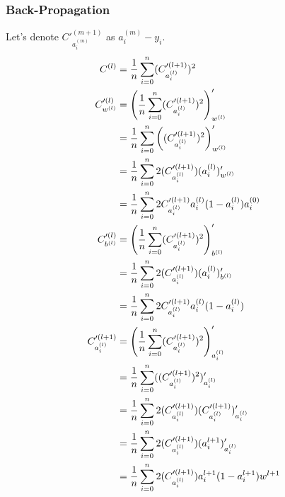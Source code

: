\documentclass{article}
\begin{document}
\subsubsection{Back-Propagation}
Let's denote $C'^{(m+1)}_{a_i^{(m)}}$ as $a_i^{(m)} - y_i$.
\begin{align}
    C^{(l)}              & = \asum[i, n] (C'^{(l+1)}_{a_i^{(l)}})^2                                     \\
    C'^{(l)}_{w^{(l)}}    & = \left(\asum[i, n] (C'^{(l+1)}_{a_i^{(l)}})^2\right)'_{w^{(l)}}             \\
                         & = \asum[i, n] \left((C'^{(l+1)}_{a_i^{(l)}})^2\right)'_{w^{(l)}}             \\
                         & = \asum[i, n] 2(C'^{(l+1)}_{a_i^{(l)}})(a^{(l)}_i)'_{w^{(l)}}                \\
                         & = \asum[i, n] 2C'^{(l+1)}_{a_i^{(l)}}a^{(l)}_i(1 - a^{(l)}_i)a_i^{(0)}       \\
    C'^{(l)}_{b^{(l)}}    & = \left(\asum[i, n] (C'^{(l+1)}_{a_i^{(l)}})^2\right)'_{b^{(l)}}             \\
                         & = \asum[i, n] 2(C'^{(l+1)}_{a_i^{(l)}})(a^{(l)}_i)'_{b^{(l)}}                \\
                         & = \asum[i, n] 2C'^{(l+1)}_{a_i^{(l)}}a^{(l)}_i(1 - a^{(l)}_i)                \\
    C'^{(l+1)}_{a_i^{(l)}} & = \left(\asum[i, n] (C'^{(l+1)}_{a_i^{(l)}})^2\right)'_{a_i^{(l)}}           \\
                         & = \asum[i, n] ((C'^{(l+1)}_{a_i^{(l)}})^2)'_{a_i^{(l)}}                      \\
                         & = \asum[i, n] 2(C'^{(l+1)}_{a_i^{(l)}})(C'^{(l+1)}_{a_i^{(l)}})'_{a_i^{(l)}} \\
                         & = \asum[i, n] 2(C'^{(l+1)}_{a_i^{(l)}})(a_i^{l+1})'_{a_i^{(l)}}              \\
                         & = \asum[i, n] 2(C'^{(l+1)}_{a_i^{(l)}})a_i^{l+1} (1 - a_i^{l+1})w^{l+1}      \\
\end{align}
\end{document}
